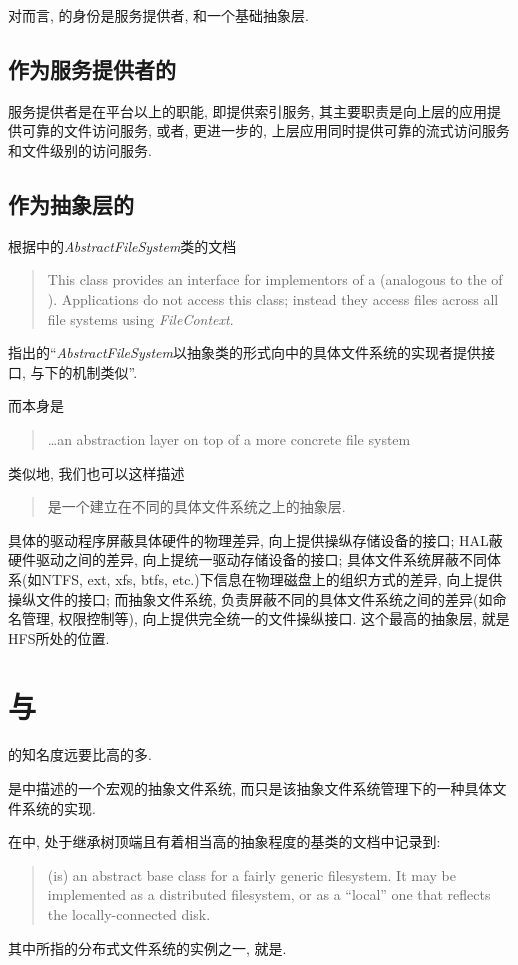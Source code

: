 对\Hadoop 而言, \HFS 的身份是服务提供者, 和一个基础抽象层.

\subsection{作为服务提供者的\HFS}
\label{ssec:hfs-intro:svr}

服务提供者是{\HFS}在{\Hadoop}平台以上的职能, 即提供索引服务,
其主要职责是向上层的\Hadoop 应用提供可靠的文件访问服务, 或者, 更进一步的,
上层应用同时提供可靠的流式访问服务和文件级别的访问服务.

\subsection{作为抽象层的\HFS}
\label{ssec:hfs-intro:al}

根据{\HadoopFS}中的\emph{AbstractFileSystem}类的文档
\begin{quote}
This class provides an interface for implementors of a \HadoopFS
(analogous to the \VFS\space of \Unix). Applications do not access this class;
instead they access files across all file systems using \emph{FileContext}.
\end{quote}
指出的``\emph{AbstractFileSystem}以抽象类的形式向{\HFS}中的具体文件系统的实现者提供接口,
与{\Unix}下{\VFS}的机制类似''.

而\VFS 本身是
\begin{quote}
    \ldots an abstraction layer on top of a more concrete file system
\end{quote}

类似地, 我们也可以这样描述\HFS
\begin{quote}
    \HFS 是一个建立在不同的具体文件系统之上的抽象层.
\end{quote}

具体的驱动程序屏蔽具体硬件的物理差异, 向上提供操纵存储设备的接口;
HAL蔽硬件驱动之间的差异, 向上提统一驱动存储设备的接口;
具体文件系统屏蔽不同体系(如NTFS, ext, xfs, btfs, etc.)下信息在物理磁盘上的组织方式的差异,
向上提供操纵文件的接口;
而抽象文件系统, 负责屏蔽不同的具体文件系统之间的差异(如命名管理, 权限控制等),
向上提供完全统一的文件操纵接口. 这个最高的抽象层, 就是HFS所处的位置.

\section{{\HFS}与{\HDFS}}

{\HDFS}的知名度远要比{\HFS}高的多.

{\HadoopFS}是中描述的一个宏观的抽象文件系统,
而{\HadoopDFS}只是该抽象文件系统管理下的一种具体文件系统的实现.

在{\HFS}中, 处于继承树顶端且有着相当高的抽象程度的基类{\FS}的文档中记录到:

\begin{quote}
(\FS\space is) an abstract base class for a fairly generic filesystem. It
may be implemented as a distributed filesystem, or as a ``local''
one that reflects the locally-connected disk.
\end{quote}

其中所指的分布式文件系统的实例之一, 就是{\HDFS}.

